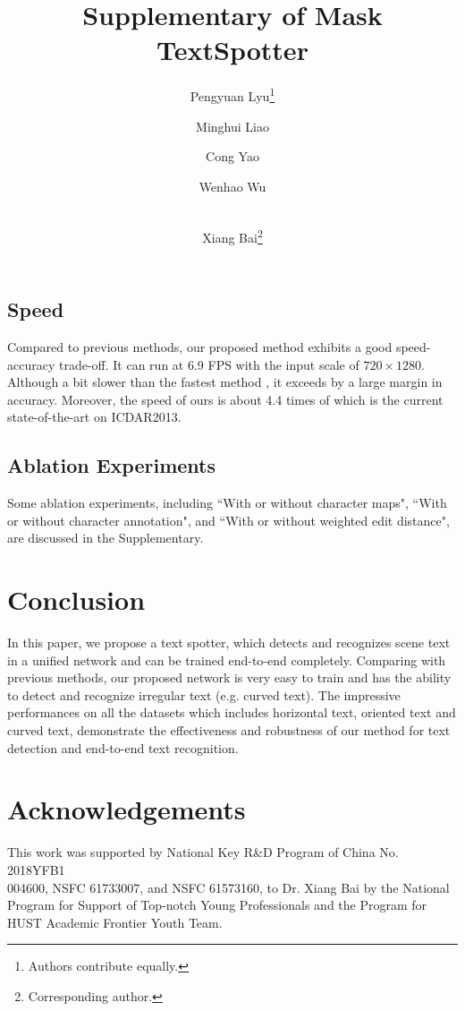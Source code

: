 \documentclass[runningheads]{llncs}
\makeatletter
\newcommand{\printfnsymbol}[1]{%
  \textsuperscript{\@fnsymbol{#1}}%
}
\makeatother
\begin{document}
\subsection{Speed}

Compared to previous methods,  our proposed method exhibits a good speed-accuracy trade-off. It can run at 6.9 FPS with the input scale of $720 \times 1280$. Although a bit slower than the fastest method \cite{Busta_2017_ICCV},  it exceeds \cite{Busta_2017_ICCV} by a large margin in accuracy. Moreover, the speed of ours is about 4.4 times of \cite{Li_2017_ICCV} which is the current state-of-the-art on ICDAR2013.

\subsection{Ablation Experiments}
Some ablation experiments, including ``With or without character maps", ``With or without character annotation", and ``With or without weighted edit distance", are discussed in the Supplementary.

\section{Conclusion}
In this paper, we propose a text spotter, which detects and recognizes scene text in a unified network and can be trained end-to-end completely. Comparing with previous methods, our proposed network is very easy to train and has the ability to detect and recognize irregular text (e.g. curved text). The impressive  performances on all the datasets which  includes  horizontal text,  oriented text and curved text,  demonstrate the effectiveness and robustness of our method for text detection and end-to-end text recognition.

\section*{Acknowledgements}
This work was supported by National Key R\&D Program of China No. 2018YFB1\\004600, NSFC 61733007, and NSFC 61573160, to Dr. Xiang Bai by the National Program for Support of Top-notch Young Professionals and the Program for HUST Academic Frontier Youth Team.







\title{Supplementary of Mask TextSpotter}
\author{Pengyuan Lyu\thanks{Authors contribute equally.} \and
Minghui Liao\printfnsymbol{1} \and
Cong Yao \and
Wenhao Wu \and \\
Xiang Bai\thanks{Corresponding author.}}
\end{document}
